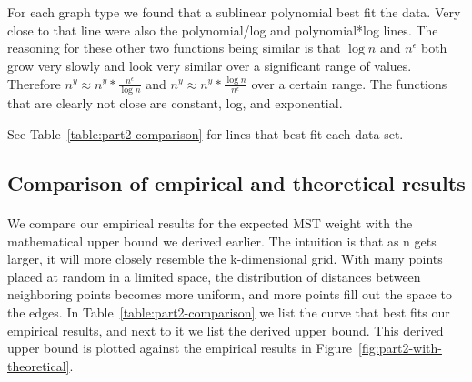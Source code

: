 \begin{figure*}[htb!]
\centering
\mbox{
\quad
{}
}
\mbox{
\quad
{}
}
\label{fig:part2-fit}
\end{figure*}

\paragraph{}
For each graph type we found that a sublinear polynomial best fit
the data. Very close to that line were also the polynomial/log and
polynomial*log lines. The reasoning for these other two functions being
similar is that $\log n$ and $n^\epsilon$ both grow very slowly and look
very similar over a significant range of values. Therefore $n^y \approx
n^y * \frac{n^\epsilon}{\log n}$ and $n^y \approx n^y * \frac{\log
  n}{n^\epsilon}$ over a certain range. The functions that are clearly not
close are constant, log, and exponential.

See Table~\ref{table:part2-comparison} for lines that best fit each
data set.


\subsection{Comparison of empirical and theoretical results}
\label{sec:part2:compare}
\paragraph{}
We compare our empirical results for the expected MST weight with the
mathematical upper bound we derived earlier. The intuition is that as n
gets larger, it will more closely resemble the k-dimensional grid. With
many points placed at random in a limited space, the distribution of
distances between neighboring points becomes more uniform, and more points
fill out the space to the edges. In Table~\ref{table:part2-comparison} we
list the curve that best fits our empirical results, and next to it we
list the derived upper bound.  This derived upper bound is plotted against the
empirical results in Figure~\ref{fig:part2-with-theoretical}.

